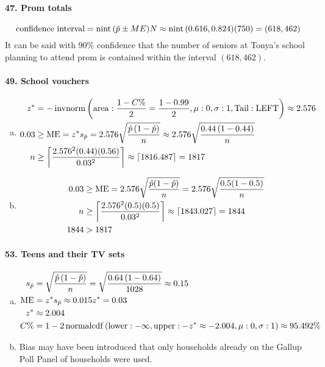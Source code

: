 		\paragraph{47. Prom totals}
			\[
				\text{confidence interval} = \operatorname{nint}{(\hat{p} \pm ME)N} \approx \operatorname{nint}{(0.616, 0.824)(750)} = (618, 462)
			\]
			It can be said with 90\% confidence that the number of seniors at Tonya's school planning to attend prom is contained within the interval $(618, 462)$.
		\paragraph{49. School vouchers}
			\begin{enumerate}[a.] 
				\item
					\begin{align*}
						z^* &= -\operatorname{invnorm}\left(\operatorname{area}:\frac{1 - C\%}{2} = \frac{1 - 0.99}{2}, \mu: 0, \sigma: 1, \mathrm{Tail: LEFT}\right) \approx 2.576 \\
						0.03 &\ge \operatorname{ME}	 = z^*s_{\hat{p}} = 2.576 \sqrt{\frac{\hat{p}\left(1 - \hat{p}\right)}{n}} \approx 2.576\sqrt{\frac{0.44\left(1 - 0.44\right)}{n}} \\
						n &\ge \left\lceil\frac{2.576^2(0.44)(0.56)}{0.03^2}\right\rceil \approx \lceil 1816.487 \rceil = 1817
					\end{align*}
				\item
					\begin{align*}
						0.03 &\ge \operatorname{ME} = 2.576\sqrt{\frac{\hat{p}(1 - \hat{p})}{n}} = 2.576\sqrt{\frac{0.5(1 - 0.5)}{n}} \\ 
						n &\ge \left\lceil\frac{2.576^2(0.5)(0.5)}{0.03^2}\right\rceil \approx \lceil 1843.027 \rceil = 1844 \\
						1844 &> 1817
					\end{align*}
			\end{enumerate}
		\paragraph{53. Teens and their TV sets}
			\begin{enumerate}[a.]
				\item
					\begin{align*}
						s_{\hat{p}} &= \sqrt{\frac{\hat{p}\left(1 - \hat{p}\right)}{n}} = \sqrt{\frac{0.64\left(1 - 0.64\right)}{1028}} \approx 0.15 \\
						\operatorname{ME} &= z^*s_{\hat{p}} \approx 0.015z^* = 0.03\\
						z^* &\approx 2.004 \\
						C\% &= 1 - 2\operatorname{normalcdf}\left(\operatorname{lower}: -\infty, \operatorname{upper}: -z^* \approx -2.004, \mu: 0, \sigma: 1\right) \approx 95.492\%
					\end{align*}
				\item
					Bias may have been introduced that only households already on the Gallup Poll Panel of households were used.
			\end{enumerate}
